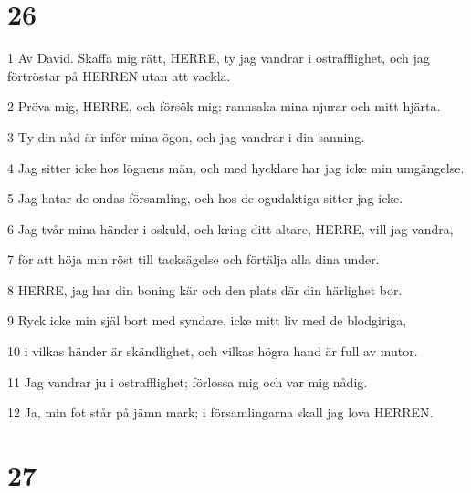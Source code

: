 \chapter{26}

\par 1 Av David. Skaffa mig rätt, HERRE, ty jag vandrar i ostrafflighet, och jag förtröstar på HERREN utan att vackla.
\par 2 Pröva mig, HERRE, och försök mig; rannsaka mina njurar och mitt hjärta.
\par 3 Ty din nåd är inför mina ögon, och jag vandrar i din sanning.
\par 4 Jag sitter icke hos lögnens män, och med hycklare har jag icke min umgängelse.
\par 5 Jag hatar de ondas församling, och hos de ogudaktiga sitter jag icke.
\par 6 Jag tvår mina händer i oskuld, och kring ditt altare, HERRE, vill jag vandra,
\par 7 för att höja min röst till tacksägelse och förtälja alla dina under.
\par 8 HERRE, jag har din boning kär och den plats där din härlighet bor.
\par 9 Ryck icke min själ bort med syndare, icke mitt liv med de blodgiriga,
\par 10 i vilkas händer är skändlighet, och vilkas högra hand är full av mutor.
\par 11 Jag vandrar ju i ostrafflighet; förlossa mig och var mig nådig.
\par 12 Ja, min fot står på jämn mark; i församlingarna skall jag lova HERREN.

\chapter{27}

